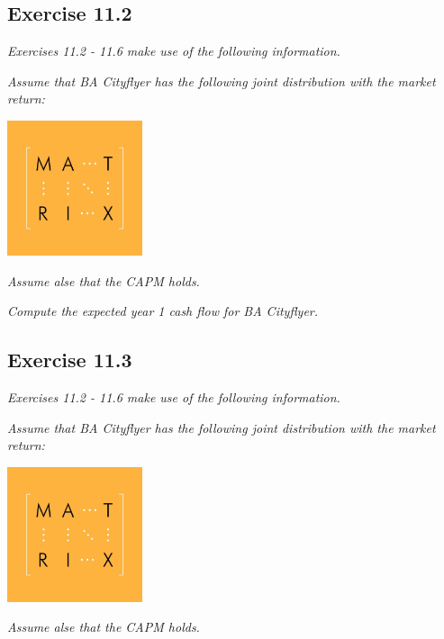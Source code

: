 \documentclass[]{book}
\theoremstyle{definition}
\theoremstyle{definition}
\theoremstyle{remark}
\begin{document}
\subsection{Exercise 11.2}\label{exercise-11.2}

\emph{Exercises 11.2 - 11.6 make use of the following information.}
\citep[p.389]{book}

\emph{Assume that BA Cityflyer has the following joint distribution with
the market return:} \citep[p.389]{book}

\begin{center}\includegraphics[width=150px]{figures/matrix} \end{center}

\emph{Assume alse that the CAPM holds.} \citep[p.389]{book}

\emph{Compute the expected year 1 cash flow for BA Cityflyer.}
\citep[p.389]{book}

\subsection{Exercise 11.3}\label{exercise-11.3}

\emph{Exercises 11.2 - 11.6 make use of the following information.}
\citep[p.389]{book}

\emph{Assume that BA Cityflyer has the following joint distribution with
the market return:} \citep[p.389]{book}

\begin{center}\includegraphics[width=150px]{figures/matrix} \end{center}

\emph{Assume alse that the CAPM holds.} \citep[p.389]{book}
\end{document}
